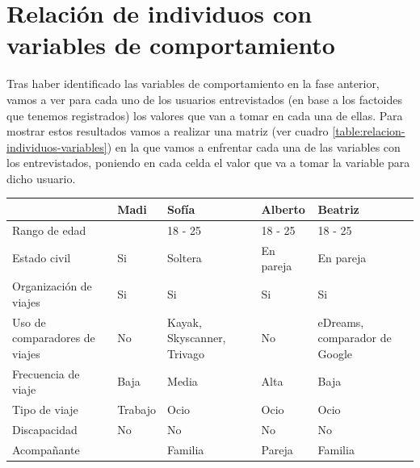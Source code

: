 \section{Relación de individuos con variables de comportamiento}
Tras haber identificado las variables de comportamiento en la fase anterior, vamos a ver para cada uno de los usuarios entrevistados (en base a los factoides
que tenemos registrados) los valores que van a tomar en cada una de ellas. Para mostrar estos resultados vamos a realizar una matriz (ver cuadro \ref{table:relacion-individuos-variables})
en la que vamos a enfrentar cada una de las variables con los entrevistados, poniendo en cada celda el valor que va a tomar la variable para dicho usuario.
\begin{table}[H]
    \centering
    \begin{tabular}{|p{10em}||p{7em}|p{7em}|p{7em}|p{8em}|}
        \hline
                                          & Madi        & Sofía                          & Alberto            & Beatriz                         \\ \hline
        Rango de edad                     &             & 18 - 25                        & 18 - 25            & 18 - 25                         \\ \hline
        Estado civil                      & Si          & Soltera                        & En pareja          & En pareja                       \\ \hline
        Organización de viajes            & Si          & Si                             & Si                 & Si                              \\ \hline
        Uso de comparadores de viajes     & No          & Kayak, Skyscanner, Trivago     & No                 & eDreams, comparador de Google   \\ \hline
        Frecuencia de viaje               & Baja        & Media                          & Alta               & Baja                            \\ \hline
        Tipo de viaje                     & Trabajo     & Ocio                           & Ocio               & Ocio                            \\ \hline
        Discapacidad                      & No          & No                             & No                 & No                              \\ \hline
        Acompañante                       &             & Familia                        & Pareja             & Familia                         \\ \hline

\end{tabular}
\end{table}
